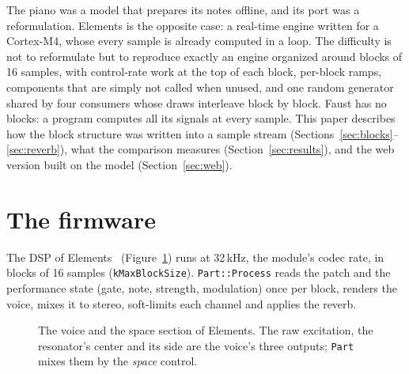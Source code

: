 \documentclass[10pt,a4paper,twocolumn]{article}
\newcommand{\code}[1]{\texttt{#1}}
\begin{document}
The piano was a model that prepares its notes offline, and its port was a reformulation. Elements is the opposite case: a real-time engine written for a Cortex-M4, whose every sample is already computed in a loop. The difficulty is not to reformulate but to reproduce exactly an engine organized around blocks of 16 samples, with control-rate work at the top of each block, per-block ramps, components that are simply not called when unused, and one random generator shared by four consumers whose draws interleave block by block. Faust has no blocks: a program computes all its signals at every sample. This paper describes how the block structure was written into a sample stream (Sections~\ref{sec:blocks}--\ref{sec:reverb}), what the comparison measures (Section~\ref{sec:results}), and the web version built on the model (Section~\ref{sec:web}).

\section{The firmware}
\label{sec:model}

The DSP of Elements~\cite{elements} (Figure~\ref{fig:arch}) runs at 32\,kHz, the module's codec rate, in blocks of 16 samples (\code{kMaxBlockSize}). \code{Part::Process} reads the patch and the performance state (gate, note, strength, modulation) once per block, renders the voice, mixes it to stereo, soft-limits each channel and applies the reverb.

\begin{figure}[t]
\centering
{}
\caption{The voice and the space section of Elements. The raw excitation, the resonator's center and its side are the voice's three outputs; \code{Part} mixes them by the \emph{space} control.}
\label{fig:arch}
\end{figure}
\end{document}
